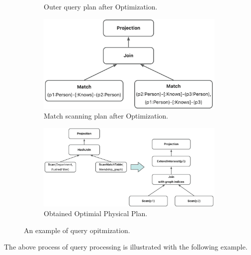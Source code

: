 {\begin{figure}
\begin{subfigure}[b]{0.4\linewidth}
        \caption{Outer query plan after Optimization.}
        \label{fig:relational-plan-optimized}
    \end{subfigure}
    \begin{subfigure}[b]{0.4\linewidth}
        \centering
        \includegraphics[width=\linewidth]{./figures/converged-logical-plan-graph-optimized.png}
        \caption{Match scanning plan after Optimization.}
        \label{fig:graph-plan-optimized}
    \end{subfigure}
    \begin{subfigure}[b]{0.5\linewidth}
        \centering
        \includegraphics[width=\linewidth]{./figures/converged-physical-plan.png}
        \caption{Obtained Optimial Physical Plan.}
        \label{fig:physical-plan-optimized}
    \end{subfigure}
    \caption{An example of query opitmization.}
    \label{fig:query-grtree-example}
\end{figure}



The above process of query processing is illustrated with the following example.

}
